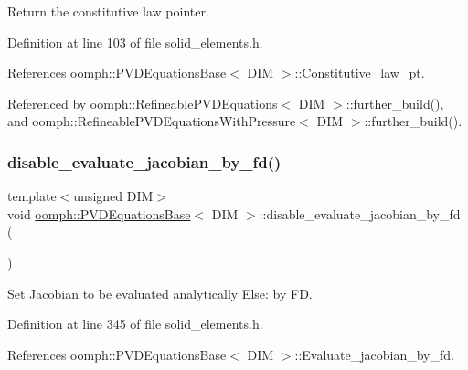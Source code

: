 Return the constitutive law pointer. 



Definition at line 103 of file solid\+\_\+elements.\+h.



References oomph\+::\+P\+V\+D\+Equations\+Base$<$ D\+I\+M $>$\+::\+Constitutive\+\_\+law\+\_\+pt.



Referenced by oomph\+::\+Refineable\+P\+V\+D\+Equations$<$ D\+I\+M $>$\+::further\+\_\+build(), and oomph\+::\+Refineable\+P\+V\+D\+Equations\+With\+Pressure$<$ D\+I\+M $>$\+::further\+\_\+build().

\mbox{\label{classoomph_1_1PVDEquationsBase_a22241bad7ba70687a5f92e084da67c14}} 
\subsubsection{\texorpdfstring{disable\+\_\+evaluate\+\_\+jacobian\+\_\+by\+\_\+fd()}{disable\_evaluate\_jacobian\_by\_fd()}}
{\footnotesize\ttfamily template$<$unsigned D\+IM$>$ \\
void \hyperlink{classoomph_1_1PVDEquationsBase}{oomph\+::\+P\+V\+D\+Equations\+Base}$<$ D\+IM $>$\+::disable\+\_\+evaluate\+\_\+jacobian\+\_\+by\+\_\+fd (\begin{DoxyParamCaption}{ }\end{DoxyParamCaption})\hspace{0.3cm}{\ttfamily [inline]}}



Set Jacobian to be evaluated analytically Else\+: by FD. 



Definition at line 345 of file solid\+\_\+elements.\+h.



References oomph\+::\+P\+V\+D\+Equations\+Base$<$ D\+I\+M $>$\+::\+Evaluate\+\_\+jacobian\+\_\+by\+\_\+fd.

\mbox{\label{classoomph_1_1PVDEquationsBase_a6768179db1eb68c90c06976329d2fbdd}} 

